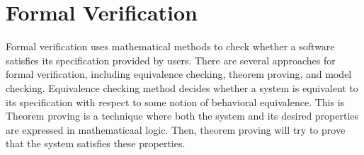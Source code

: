 \section*{Formal Verification} 

Formal verification uses mathematical methods to check whether a software satisfies its specification provided by users. 
%
There are several approaches for formal verification, including equivalence checking, theorem proving, and model checking. Equivalence checking method decides whether a system is equivalent to its specification with respect to some notion of behavioral equivalence. This is  Theorem proving is a technique where both the  system and its desired properties are expressed in mathematicaal logic. Then, theorem proving  will try to prove that the system satisfies these properties. 

